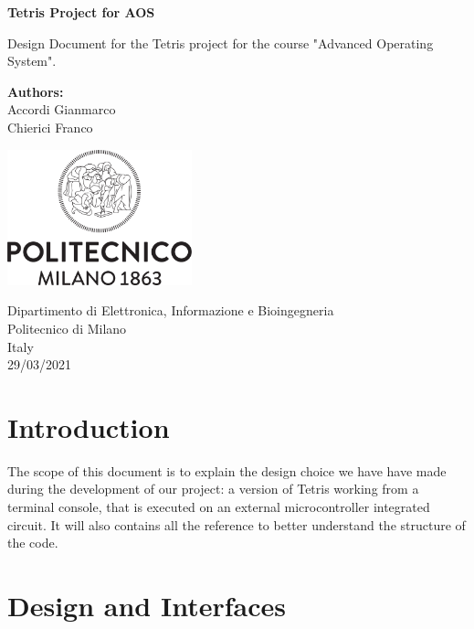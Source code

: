 \documentclass{article}
\begin{document}
\begin{titlepage}
    \begin{center}
       \vspace*{4cm}

       \textbf{\LARGE Tetris Project for AOS}

       \vspace{1.5cm}
        Design Document for the Tetris project for the course "Advanced Operating System".
            
       \vfill

       \textbf{Authors:}\\
       Accordi Gianmarco\\
       Chierici Franco

       \vspace{0.8cm}
     
       \includegraphics[width=0.4\textwidth]{img/Logo_Politecnico_Milano.png}
            
       Dipartimento di Elettronica, Informazione e Bioingegneria\\
       Politecnico di Milano\\
       Italy\\
       29/03/2021
            
   \end{center}
\end{titlepage}

\tableofcontents

\newpage

\section{Introduction}
The scope of this document is to explain the design choice we have have made during the development of our project: a version of Tetris working from a terminal console, that is executed on an external microcontroller integrated circuit. 
It will also contains all the reference to better understand the structure of the code.

\section{Design and Interfaces}
\end{document}
